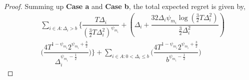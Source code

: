 \begin{proof}

 
Summing up \textbf{Case a} and \textbf{Case b}, the total expected regret is given by,
\begin{align*}
 &\sum\limits_{i\in A:\Delta_{i} > b}\bigg\lbrace \dfrac{T\Delta_{i}}{( \frac{3}{2} T\Delta_i^{2})^{\psi_{m_i}}}
  + \left( \Delta_i +\dfrac{32\Delta_i\psi_{m_i}\log( \frac{3}{2} T\Delta_i^2)}{\frac{3}{2} \Delta_i^2}\right)\\
  & \bigg(\dfrac{4T^{1-\psi_{m_i}}2^{\psi_{m_i}+\frac{3}{2}}}{\Delta_{i}^{\psi_{m_i}-\frac{1}{2}}} \bigg)\bigg \rbrace +\sum_{i\in A: 0 < \Delta_{i} \leq b}\bigg(\dfrac{4T^{1-\psi_{m_i}}2^{\psi_{m_i}+\frac{3}{2}}}{b^{\psi_{m_i}-\frac{1}{2}}} \bigg)
\end{align*}


\end{proof}